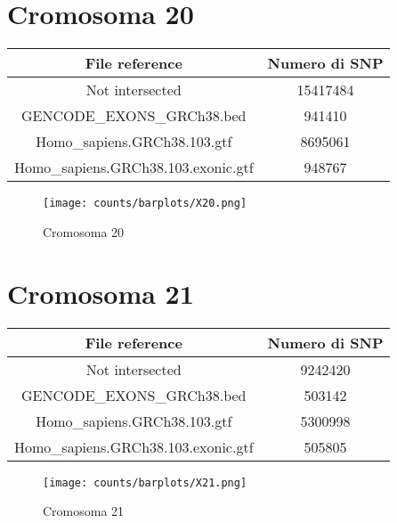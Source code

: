 \section*{Cromosoma 20}
  \begin{table}[H]\centering
	\begin{tabular}{|c|c|}
	  \hline
	  File reference & Numero di SNP \\
		\hline
		Not intersected & 15417484 \\
	  \hline
	  GENCODE\_EXONS\_GRCh38.bed & 941410 \\
	  \hline
	  Homo\_sapiens.GRCh38.103.gtf & 8695061 \\
	  \hline
	  Homo\_sapiens.GRCh38.103.exonic.gtf & 948767 \\
	  \hline
	\end{tabular}
  \end{table}
  \begin{figure}[H]
	\texttt{[image: counts/barplots/X20.png]}
	\caption{Cromosoma 20}
	\label{fig:chr20}
  \end{figure}

\section*{Cromosoma 21}
  \begin{table}[H]\centering
	\begin{tabular}{|c|c|}
	  \hline
	  File reference & Numero di SNP \\
		\hline
		Not intersected & 9242420 \\
	  \hline
	  GENCODE\_EXONS\_GRCh38.bed & 503142 \\
	  \hline
	  Homo\_sapiens.GRCh38.103.gtf & 5300998 \\
	  \hline
	  Homo\_sapiens.GRCh38.103.exonic.gtf & 505805 \\
	  \hline
	\end{tabular}
  \end{table}
  \begin{figure}[H]
	\texttt{[image: counts/barplots/X21.png]}
	\caption{Cromosoma 21}
	\label{fig:chr21}
  \end{figure}

